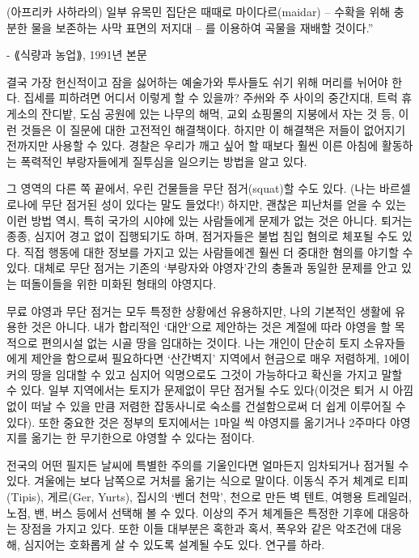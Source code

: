 \documentclass[11pt, b6paper, openany]{memoir}
\begin{document}
\begin{article}
    (아프리카 사하라의) 일부 유목민 집단은 때때로 마이다르(maidar) -- 수확을 위해 충분한 물을 보존하는 사막 표면의 저지대 -- 를 이용하여 곡물을 재배할 것이다.”
    
    - ⟪식량과 농업⟫, 1991년 본문

결국 가장 헌신적이고 잠을 싫어하는 예술가와 투사들도 쉬기 위해 머리를 뉘어야 한다. 집세를 피하려면 어디서 이렇게 할 수 있을까? 주州와 주 사이의 중간지대, 트럭 휴게소의 잔디밭, 도심 공원에 있는 나무의 해먹, 교외 쇼핑몰의 지붕에서 자는 것 등, 이런 것들은 이 질문에 대한 고전적인 해결책이다. 하지만 이 해결책은 저들이 없어지기 전까지만 사용할 수 있다. 경찰은 우리가 깨고 싶어 할 때보다 훨씬 이른 아침에 활동하는 폭력적인 부랑자들에게 질투심을 일으키는 방법을 알고 있다.

그 영역의 다른 쪽 끝에서, 우린 건물들을 무단 점거(squat)할 수도 있다. (나는 바르셀로나에 무단 점거된 성이 있다는 말도 들었다!) 하지만, 괜찮은 피난처를 얻을 수 있는 이런 방법 역시, 특히 국가의 시야에 있는 사람들에게 문제가 없는 것은 아니다. 퇴거는 종종, 심지어 경고 없이 집행되기도 하며, 점거자들은 불법 침입 혐의로 체포될 수도 있다. 직접 행동에 대한 정보를 가지고 있는 사람들에겐 훨씬 더 중대한 혐의를 야기할 수 있다. 대체로 무단 점거는 기존의 ‘부랑자와 야영자’간의 충돌과 동일한 문제를 안고 있는 떠돌이들을 위한 미화된 형태의 야영지다.

무료 야영과 무단 점거는 모두 특정한 상황에선 유용하지만, 나의 기본적인 생활에 유용한 것은 아니다. 내가 합리적인 ‘대안’으로 제안하는 것은 계절에 따라 야영을 할 목적으로 편의시설 없는 시골 땅을 임대하는 것이다. 나는 개인이 단순히 토지 소유자들에게 제안을 함으로써 필요하다면 ‘산간벽지’ 지역에서 현금으로 매우 저렴하게, 1에이커의 땅을 임대할 수 있고 심지어 익명으로도 그것이 가능하다고 확신을 가지고 말할 수 있다. 일부 지역에서는 토지가 문제없이 무단 점거될 수도 있다(이것은 퇴거 시 아낌없이 떠날 수 있을 만큼 저렴한 잡동사니로 숙소를 건설함으로써 더 쉽게 이루어질 수 있다). 또한 중요한 것은 정부의 토지에서는 1마일 씩 야영지를 옮기거나 2주마다 야영지를 옮기는 한 무기한으로 야영할 수 있다는 점이다.

전국의 어떤 필지든 날씨에 특별한 주의를 기울인다면 얼마든지 임차되거나 점거될 수 있다.  겨울에는 보다 남쪽으로 거처를 옮기는 식으로 말이다. 이동식 주거 체계로 티피(Tipis), 게르(Ger, Yurts), 집시의 ‘벤더 천막’, 천으로 만든 벽 텐트, 여행용 트레일러, 노점, 밴, 버스 등에서 선택해 볼 수 있다. 이상의 주거 체계들은 특정한 기후에 대응하는 장점을 가지고 있다. 또한 이들 대부분은 혹한과 혹서, 폭우와 같은 악조건에 대응해, 심지어는 호화롭게 살 수 있도록 설계될 수도 있다. 연구를 하라. 


\end{article}
\end{document}
